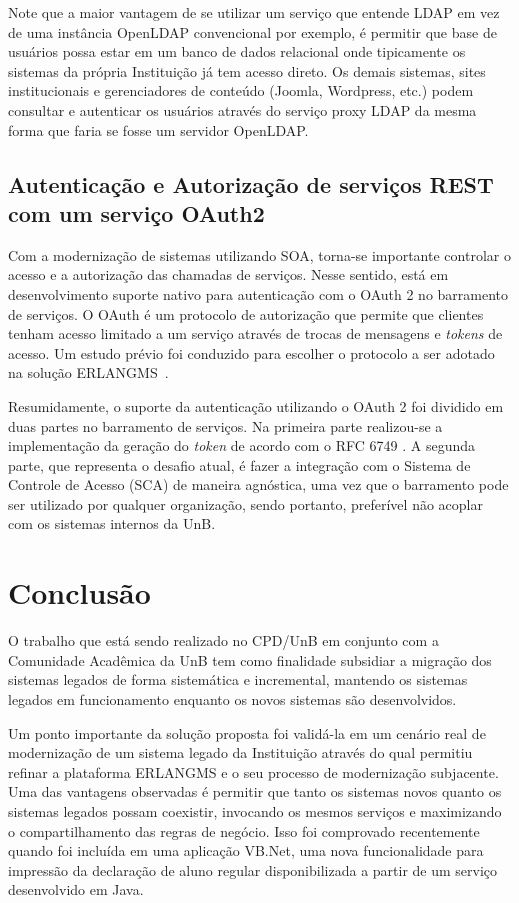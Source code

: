\documentclass[12pt]{article}
\begin{document}
Note que a maior vantagem de se utilizar um serviço que entende LDAP
em vez de uma instância OpenLDAP convencional por exemplo, 
é permitir que base de usuários possa
estar em um banco de dados relacional onde tipicamente os sistemas da própria Instituição
já tem acesso direto. Os demais sistemas, sites institucionais 
e gerenciadores de conteúdo (Joomla, Wordpress, etc.)
podem consultar e autenticar os usuários através do serviço proxy LDAP 
da mesma forma que faria se fosse um servidor OpenLDAP.



\subsection{Autenticação e Autorização de serviços REST com um serviço OAuth2}\label{oauth2}

Com a modernização de sistemas utilizando SOA, torna-se
importante controlar o acesso e a autorização das chamadas de serviços.
Nesse sentido, está em desenvolvimento suporte nativo para autenticação com o OAuth 2 no barramento de serviços. 
O OAuth é um protocolo de autorização 
que permite que clientes tenham 
acesso limitado a um serviço através de trocas de 
mensagens e \textit{tokens} de acesso. Um estudo prévio foi conduzido para
escolher o protocolo a ser adotado
na solução ERLANGMS~\cite{7521451}.


Resumidamente, o suporte da autenticação utilizando o OAuth 2 foi dividido em duas partes no barramento de serviços.
Na primeira parte realizou-se a implementação
da geração do \textit{token} de acordo com o RFC 6749 \cite{hardt2012oauth}.
A segunda parte, que representa 
o desafio atual, é fazer a integração com o Sistema de Controle de Acesso (SCA)
de maneira agnóstica, uma vez que o barramento pode ser utilizado 
por qualquer organização, sendo portanto, preferível não acoplar com 
os sistemas internos da UnB.




\section{Conclusão}

O trabalho que está sendo realizado
no CPD/UnB em conjunto com a Comunidade Acadêmica da UnB
tem como finalidade subsidiar
a migração
dos sistemas legados de forma sistemática 
e incremental, mantendo os sistemas legados
em funcionamento enquanto os novos sistemas
são desenvolvidos.

Um ponto importante
da solução proposta foi validá-la em um cenário real de modernização de um sistema
legado da Instituição
através do qual permitiu refinar a plataforma ERLANGMS e o seu processo de modernização subjacente.
Uma das vantagens observadas é permitir que tanto 
os sistemas novos quanto os sistemas legados possam coexistir, 
invocando os mesmos serviços e
maximizando o compartilhamento das regras de negócio. Isso foi comprovado 
recentemente quando foi incluída em uma aplicação VB.Net, uma nova funcionalidade
para impressão da declaração de aluno regular disponibilizada a partir de um serviço desenvolvido em Java.




\end{document}
